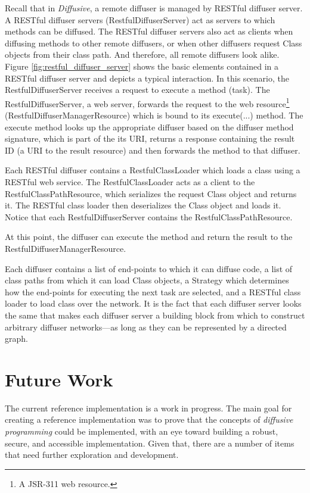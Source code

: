 \documentclass[11pt]{article}
\begin{document}
Recall that in \emph{Diffusive}, a remote diffuser is managed by RESTful diffuser server. A RESTful diffuser servers (\textsf{RestfulDiffuserServer}) act as servers to which methods can be diffused. The RESTful diffuser servers also act as clients when diffusing methods to other remote diffusers, or when other diffusers request \textsf{Class} objects from their class path. And therefore, all remote diffusers look alike. Figure \ref{fig:restful_diffuser_server} shows the basic elements contained in a RESTful diffuser server and depicts a typical interaction. In this scenario, the \textsf{RestfulDiffuserServer} receives a request to execute a method (task). The \textsf{RestfulDiffuserServer}, a web server, forwards the request to the web resource\footnote{A JSR-311 web resource.} (\textsf{RestfulDiffuserManagerResource}) which is bound to its \textsf{execute(...)} method. The execute method looks up the appropriate diffuser based on the diffuser method signature, which is part of the its URI, returns a response containing the result ID (a URI to the result resource) and then forwards the method to that diffuser. 

Each RESTful diffuser contains a \textsf{RestfulClassLoader} which loads a class using a RESTful web service. The \textsf{RestfulClassLoader} acts as a client to the \textsf{RestfulClassPathResource}, which serializes the request \textsf{Class} object and returns it. The RESTful class loader then deserializes the \textsf{Class} object and loads it. Notice that each \textsf{RestfulDiffuserServer} contains the \textsf{RestfulClassPathResource}.

At this point, the diffuser can execute the method and return the result to the \textsf{Restful\-Diffuser\-Manager\-Resource}.

Each diffuser contains a list of end-points to which it can diffuse code, a list of class paths from which it can load \textsf{Class} objects, a \textsf{Strategy} which determines how the end-points for executing the next task are selected, and a RESTful class loader to load class over the network. It is the fact that each diffuser server looks the same that makes each diffuser server a building block from which to construct arbitrary diffuser networks---as long as they can be represented by a directed graph.

%
%
\section{Future Work\label{sec:future_work}}
The current reference implementation is a work in progress. The main goal for creating a reference implementation was to prove that the concepts of \emph{diffusive programming} could be implemented, with an eye toward building a robust, secure, and accessible implementation. Given that, there are a number of items that need further exploration and development.
\end{document}
